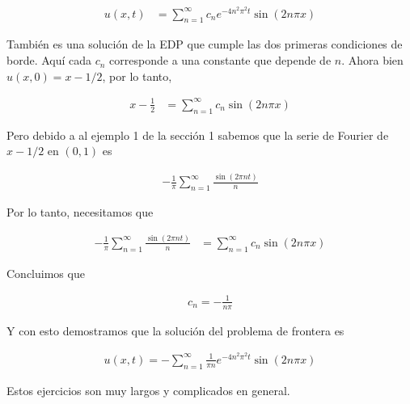 \documentclass{article}
\theoremstyle{plain}
\theoremstyle{definition}
\begin{document}
\begin{align*}
    u(x,t) &= \sum_{n=1}^{\infty}c_ne^{-4n^2\pi^2t}\sin(2n\pi x)
\end{align*}

También es una solución de la EDP que cumple las dos primeras condiciones de borde. Aquí  cada $c_n$ corresponde a una constante que depende de $n$. Ahora bien $u(x,0) = x-1/2$, por lo tanto,


\begin{align*}
    x -\frac{1}{2}&= \sum_{n=1}^{\infty}c_n\sin(2n\pi x)
\end{align*}


Pero debido a al ejemplo 1 de la sección 1 sabemos que la serie de Fourier de $x-1/2$ en $(0,1)$ es

\begin{align*}
    - \frac{1}{\pi}\sum_{n=1}^\infty \frac{\sin(2\pi n t)}{n}
\end{align*}

Por lo tanto, necesitamos que

\begin{align*}
    - \frac{1}{\pi}\sum_{n=1}^\infty \frac{\sin(2\pi n t)}{n}&= \sum_{n=1}^{\infty}c_n\sin(2n\pi x)
\end{align*}

Concluimos que


\begin{align*}
    c_n= -\frac{1}{n\pi}
\end{align*}


Y con esto demostramos que la solución del problema de frontera es

\begin{align*}
    u(x,t) = -\sum_{n=1}^\infty \frac{1}{\pi n}e^{-4n^2\pi^2t}\sin(2n\pi x)
\end{align*}

Estos ejercicios son muy largos y complicados en general.
\end{document}
